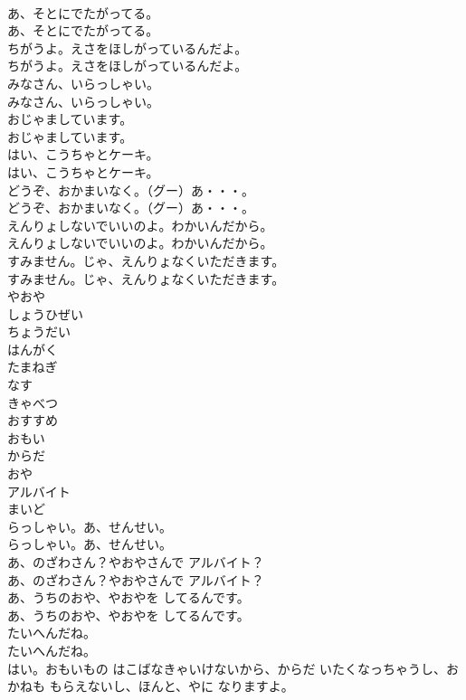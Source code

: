 \documentclass[8pt]{extreport}
\begin{document}
\begin{CJK}{UTF8}{min}
\\	あ、そとにでたがってる。
\\	あ、そとにでたがってる。
\\	ちがうよ。えさをほしがっているんだよ。
\\	ちがうよ。えさをほしがっているんだよ。
\\	みなさん、いらっしゃい。
\\	みなさん、いらっしゃい。
\\	おじゃましています。
\\	おじゃましています。
\\	はい、こうちゃとケーキ。
\\	はい、こうちゃとケーキ。
\\	どうぞ、おかまいなく。（グー）あ・・・。
\\	どうぞ、おかまいなく。（グー）あ・・・。
\\	えんりょしないでいいのよ。わかいんだから。
\\	えんりょしないでいいのよ。わかいんだから。
\\	すみません。じゃ、えんりょなくいただきます。
\\	すみません。じゃ、えんりょなくいただきます。
\\	やおや
\\	しょうひぜい
\\	ちょうだい
\\	はんがく
\\	たまねぎ
\\	なす
\\	きゃべつ
\\	おすすめ
\\	おもい
\\	からだ
\\	おや
\\	アルバイト
\\	まいど
\\	らっしゃい。あ、せんせい。
\\	らっしゃい。あ、せんせい。
\\	あ、のざわさん？やおやさんで アルバイト？
\\	あ、のざわさん？やおやさんで アルバイト？
\\	あ、うちのおや、やおやを してるんです。
\\	あ、うちのおや、やおやを してるんです。
\\	たいへんだね。
\\	たいへんだね。
\\	はい。おもいもの はこばなきゃいけないから、からだ いたくなっちゃうし、おかねも もらえないし、ほんと、やに なりますよ。

\end{CJK}
\end{document}
